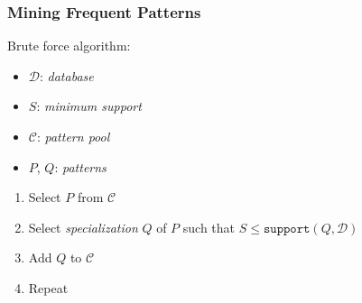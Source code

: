 \documentclass{beamer}
\begin{document}
\begin{frame}
  \frametitle{Mining Frequent Patterns}






  Brute force algorithm:

  {\small
  \begin{itemize}
  \item $\mathcal{D}$: \emph{database}
  \item $S$: \emph{minimum support}
  \item $\mathcal{C}$: \emph{pattern pool}
  \item $P$, $Q$: \emph{patterns}
  \end{itemize}
  }
  
  \begin{enumerate}
  \item Select $P$ from $\mathcal{C}$
  \item Select \emph{specialization} $Q$ of $P$ such that $S \leq
    \texttt{support}(Q, \mathcal{D})$
  \item Add $Q$ to $\mathcal{C}$
  \item Repeat
  \end{enumerate}

\end{frame}
\end{document}
